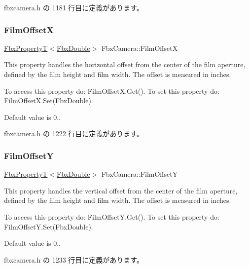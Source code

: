  fbxcamera.\+h の 1181 行目に定義があります。

\mbox{\label{class_fbx_camera_aa0a5e1ab510d4b87db69e8ed6febacc3}} 
\subsubsection{\texorpdfstring{Film\+OffsetX}{FilmOffsetX}}
{\footnotesize\ttfamily \hyperlink{class_fbx_property_t}{Fbx\+PropertyT}$<$\hyperlink{fbxtypes_8h_a171e72a1c46fc15c1a6c9c31948c1c5b}{Fbx\+Double}$>$ Fbx\+Camera\+::\+Film\+OffsetX}

This property handles the horizontal offset from the center of the film aperture, defined by the film height and film width. The offset is measured in inches.

To access this property do\+: Film\+Offset\+X.\+Get(). To set this property do\+: Film\+Offset\+X.\+Set(\+Fbx\+Double).

Default value is 0.. 

 fbxcamera.\+h の 1222 行目に定義があります。

\mbox{\label{class_fbx_camera_a244464e212906b44d5f827a8cdba0444}} 
\subsubsection{\texorpdfstring{Film\+OffsetY}{FilmOffsetY}}
{\footnotesize\ttfamily \hyperlink{class_fbx_property_t}{Fbx\+PropertyT}$<$\hyperlink{fbxtypes_8h_a171e72a1c46fc15c1a6c9c31948c1c5b}{Fbx\+Double}$>$ Fbx\+Camera\+::\+Film\+OffsetY}

This property handles the vertical offset from the center of the film aperture, defined by the film height and film width. The offset is measured in inches.

To access this property do\+: Film\+Offset\+Y.\+Get(). To set this property do\+: Film\+Offset\+Y.\+Set(\+Fbx\+Double).

Default value is 0.. 

 fbxcamera.\+h の 1233 行目に定義があります。

\mbox{\label{class_fbx_camera_ac7583ff2d3c73fa3e4f514ba29504be5}} 
